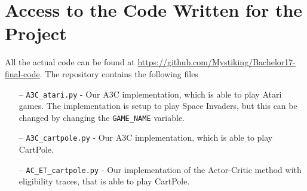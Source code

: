 \documentclass[11pt]{article}
\begin{document}
\section{Access to the Code Written for the Project}\label{a:code}

All the actual code can be found at
\url{https://github.com/Mystiking/Bachelor17-final-code}.
The repository contains the following files
\begin{itemize}
    \item[--] \texttt{A3C\_atari.py} - Our A3C implementation, which is able to play Atari games.
        The implementation is setup to play Space Invaders, but this can be changed by changing the
        \texttt{GAME\_NAME} variable.
    \item[--] \texttt{A3C\_cartpole.py} - Our A3C implementation, which is able to play CartPole. 
    \item[--] \texttt{AC\_ET\_cartpole.py} - Our implementation of the Actor-Critic method with eligibility traces, that is able to play CartPole.
\end{itemize}
\end{document}
